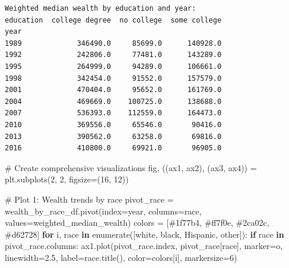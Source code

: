 \documentclass[
  letterpaper,
  DIV=11,
  numbers=noendperiod]{scrartcl}
\newenvironment{Shaded}{\begin{snugshade}}{\end{snugshade}}
\newcommand{\BuiltInTok}[1]{\textcolor[rgb]{0.00,0.23,0.31}{#1}}
\newcommand{\CommentTok}[1]{\textcolor[rgb]{0.37,0.37,0.37}{#1}}
\newcommand{\ControlFlowTok}[1]{\textcolor[rgb]{0.00,0.23,0.31}{\textbf{#1}}}
\newcommand{\DecValTok}[1]{\textcolor[rgb]{0.68,0.00,0.00}{#1}}
\newcommand{\FloatTok}[1]{\textcolor[rgb]{0.68,0.00,0.00}{#1}}
\newcommand{\KeywordTok}[1]{\textcolor[rgb]{0.00,0.23,0.31}{\textbf{#1}}}
\newcommand{\NormalTok}[1]{\textcolor[rgb]{0.00,0.23,0.31}{#1}}
\newcommand{\OperatorTok}[1]{\textcolor[rgb]{0.37,0.37,0.37}{#1}}
\newcommand{\StringTok}[1]{\textcolor[rgb]{0.13,0.47,0.30}{#1}}
\begin{document}
\begin{verbatim}
Weighted median wealth by education and year:
education  college degree  no college  some college
year                                               
1989             346490.0     85699.0      140928.0
1992             242806.0     77481.0      143289.0
1995             264999.0     94289.0      106661.0
1998             342454.0     91552.0      157579.0
2001             470404.0     95652.0      161769.0
2004             469669.0    100725.0      138688.0
2007             536393.0    112559.0      164473.0
2010             369556.0     65546.0       90416.0
2013             390562.0     63258.0       69816.0
2016             410800.0     69921.0       96905.0
\end{verbatim}

\begin{Shaded}
\begin{Highlighting}[]
\CommentTok{\# Create comprehensive visualizations}
\NormalTok{fig, ((ax1, ax2), (ax3, ax4)) }\OperatorTok{=}\NormalTok{ plt.subplots(}\DecValTok{2}\NormalTok{, }\DecValTok{2}\NormalTok{, figsize}\OperatorTok{=}\NormalTok{(}\DecValTok{16}\NormalTok{, }\DecValTok{12}\NormalTok{))}

\CommentTok{\# Plot 1: Wealth trends by race}
\NormalTok{pivot\_race }\OperatorTok{=}\NormalTok{ wealth\_by\_race\_df.pivot(index}\OperatorTok{=}\StringTok{\textquotesingle{}year\textquotesingle{}}\NormalTok{, columns}\OperatorTok{=}\StringTok{\textquotesingle{}race\textquotesingle{}}\NormalTok{, values}\OperatorTok{=}\StringTok{\textquotesingle{}weighted\_median\_wealth\textquotesingle{}}\NormalTok{)}
\NormalTok{colors }\OperatorTok{=}\NormalTok{ [}\StringTok{\textquotesingle{}\#1f77b4\textquotesingle{}}\NormalTok{, }\StringTok{\textquotesingle{}\#ff7f0e\textquotesingle{}}\NormalTok{, }\StringTok{\textquotesingle{}\#2ca02c\textquotesingle{}}\NormalTok{, }\StringTok{\textquotesingle{}\#d62728\textquotesingle{}}\NormalTok{]}
\ControlFlowTok{for}\NormalTok{ i, race }\KeywordTok{in} \BuiltInTok{enumerate}\NormalTok{([}\StringTok{\textquotesingle{}white\textquotesingle{}}\NormalTok{, }\StringTok{\textquotesingle{}black\textquotesingle{}}\NormalTok{, }\StringTok{\textquotesingle{}Hispanic\textquotesingle{}}\NormalTok{, }\StringTok{\textquotesingle{}other\textquotesingle{}}\NormalTok{]):}
    \ControlFlowTok{if}\NormalTok{ race }\KeywordTok{in}\NormalTok{ pivot\_race.columns:}
\NormalTok{        ax1.plot(pivot\_race.index, pivot\_race[race], marker}\OperatorTok{=}\StringTok{\textquotesingle{}o\textquotesingle{}}\NormalTok{, linewidth}\OperatorTok{=}\FloatTok{2.5}\NormalTok{, }
\NormalTok{                label}\OperatorTok{=}\NormalTok{race.title(), color}\OperatorTok{=}\NormalTok{colors[i], markersize}\OperatorTok{=}\DecValTok{6}\NormalTok{)}


\end{Highlighting}
\end{Shaded}
\end{document}
